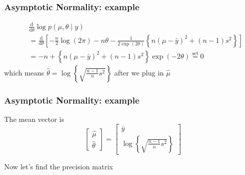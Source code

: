 \documentclass{beamer}
\begin{document}
\begin{frame}
\frametitle{Asymptotic Normality: example}

\begin{align*}
&\frac{\text{d}}{\text{d} \theta} \log p(\mu, \theta \mid y) \\
&= \frac{\text{d}}{\text{d} \theta }\left[ -\frac{n}{2}\log(2\pi) -n\theta -\frac{1}{2 \exp(2\theta) } \left\{ n(\mu - \bar{y})^2 + (n-1)s^2 \right\} \right] \\
&=  -n + \left\{ n(\mu - \bar{y})^2 + (n-1)s^2 \right\} \exp(-2\theta) \overset{\text{set}}{=} 0 
\end{align*}
which means $\hat{\theta} = \log \left\{ \sqrt{ \frac{n-1}{n}s^2}  \right\}$ after we plug in $\hat{\mu}$

\end{frame}

\begin{frame}
\frametitle{Asymptotic Normality: example}

The mean vector is
$$
\left[\begin{array}{c}
\hat{\mu} \\
\hat{\theta}
\end{array}\right]
= 
\left[\begin{array}{c}
\bar{y}\\
\log \left\{ \sqrt{ \frac{n-1}{n}s^2}  \right\}
\end{array}\right]
$$

Now let's find the precision matrix

\end{frame}
\end{document}
